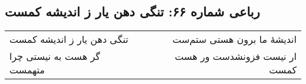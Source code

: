 \begin{center}
\section*{رباعی شماره ۶۶: تنگی دهن یار ز اندیشه کمست}
\label{sec:sh066}
\begin{longtable}{l p{0.5cm} r}
تنگی دهن یار ز اندیشه کمست
&&
اندیشهٔ ما برون هستی ستم‌ست
\\
گر هست به نیستی چرا متهمست
&&
ار نیست فزونشدست ور هست کمست
\\
\end{longtable}
\end{center}
